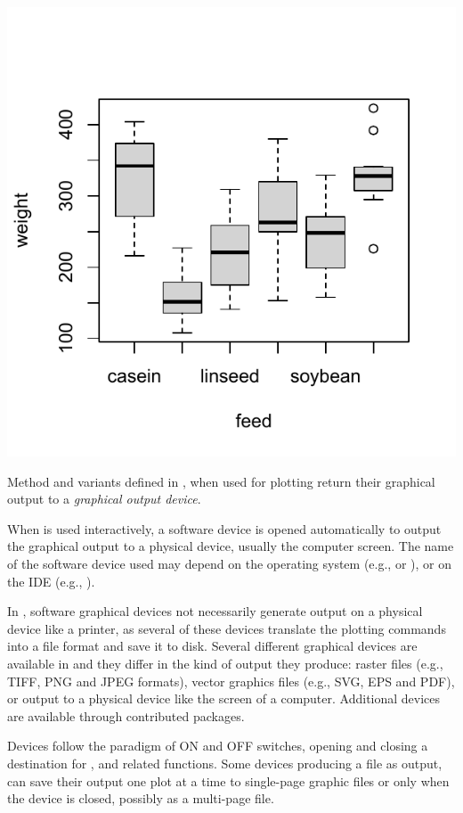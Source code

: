 \documentclass[krantz2]{krantz}\usepackage{knitr}
\begin{document}
\begin{knitrout}\footnotesize
{}\color{fgcolor}\begin{kframe}
\begin{alltt}
 \hlopt{~}   
\end{alltt}
\end{kframe}

{\centering \includegraphics[width=.54\textwidth]{figure/pos-plot-3-1} 

}


\end{knitrout}

Method  and variants defined in \Rlang, when used for plotting return their graphical output to a \emph{graphical output device}.

When \Rlang is used interactively, a software device is opened automatically to output the graphical output to a physical device, usually the computer screen. The name of the \Rlang software device used may depend on the operating system (e.g.,   or ), or on the IDE (e.g., \RStudio).

In \Rlang, software graphical devices not necessarily generate output on a physical device like a printer, as several of these devices translate the plotting commands into a file format and save it to disk. Several different graphical devices are available in \Rlang and they differ in the kind of output they produce: raster files (e.g., TIFF, PNG and JPEG formats), vector graphics files (e.g., SVG, EPS and PDF), or output to a physical device like the screen of a computer. Additional devices are available through contributed \Rlang packages.

Devices follow the paradigm of ON and OFF switches, opening and closing a destination for ,  and related functions. Some devices producing a file as output, can save their output one plot at a time to single-page graphic files or only when the device is closed, possibly as a multi-page file.
\end{document}
